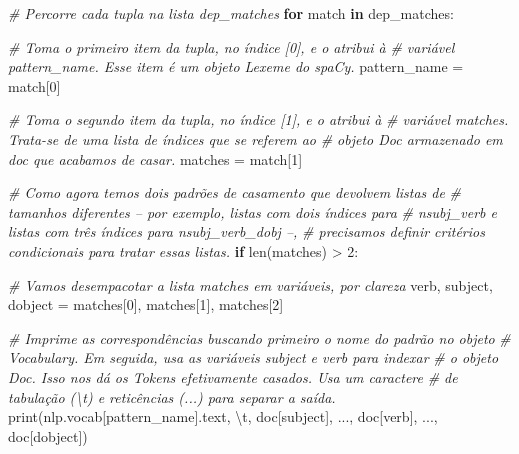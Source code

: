 \documentclass[
  brazilian,
]{article}
\newenvironment{Shaded}{}{}
\newcommand{\BuiltInTok}[1]{#1}
\newcommand{\CharTok}[1]{\textcolor[rgb]{0.25,0.44,0.63}{#1}}
\newcommand{\CommentTok}[1]{\textcolor[rgb]{0.38,0.63,0.69}{\textit{#1}}}
\newcommand{\ControlFlowTok}[1]{\textcolor[rgb]{0.00,0.44,0.13}{\textbf{#1}}}
\newcommand{\DecValTok}[1]{\textcolor[rgb]{0.25,0.63,0.44}{#1}}
\newcommand{\KeywordTok}[1]{\textcolor[rgb]{0.00,0.44,0.13}{\textbf{#1}}}
\newcommand{\NormalTok}[1]{#1}
\newcommand{\OperatorTok}[1]{\textcolor[rgb]{0.40,0.40,0.40}{#1}}
\newcommand{\StringTok}[1]{\textcolor[rgb]{0.25,0.44,0.63}{#1}}
\begin{document}
\begin{Shaded}
\begin{Highlighting}[]
\CommentTok{\# Percorre cada tupla na lista \textquotesingle{}dep\_matches\textquotesingle{}}
\ControlFlowTok{for}\NormalTok{ match }\KeywordTok{in}\NormalTok{ dep\_matches:}

    \CommentTok{\# Toma o primeiro item da tupla, no índice [0], e o atribui à}
    \CommentTok{\# variável \textquotesingle{}pattern\_name\textquotesingle{}. Esse item é um objeto Lexeme do spaCy.}
\NormalTok{    pattern\_name }\OperatorTok{=}\NormalTok{ match[}\DecValTok{0}\NormalTok{]}

    \CommentTok{\# Toma o segundo item da tupla, no índice [1], e o atribui à}
    \CommentTok{\# variável \textquotesingle{}matches\textquotesingle{}. Trata{-}se de uma lista de índices que se referem ao}
    \CommentTok{\# objeto Doc armazenado em \textquotesingle{}doc\textquotesingle{} que acabamos de casar.}
\NormalTok{    matches }\OperatorTok{=}\NormalTok{ match[}\DecValTok{1}\NormalTok{]}

    \CommentTok{\# Como agora temos dois padrões de casamento que devolvem listas de}
    \CommentTok{\# tamanhos diferentes – por exemplo, listas com dois índices para}
    \CommentTok{\# \textquotesingle{}nsubj\_verb\textquotesingle{} e listas com três índices para \textquotesingle{}nsubj\_verb\_dobj\textquotesingle{} –,}
    \CommentTok{\# precisamos definir critérios condicionais para tratar essas listas.}
    \ControlFlowTok{if} \BuiltInTok{len}\NormalTok{(matches) }\OperatorTok{\textgreater{}} \DecValTok{2}\NormalTok{:}

        \CommentTok{\# Vamos desempacotar a lista \textquotesingle{}matches\textquotesingle{} em variáveis, por clareza}
\NormalTok{        verb, subject, dobject }\OperatorTok{=}\NormalTok{ matches[}\DecValTok{0}\NormalTok{], matches[}\DecValTok{1}\NormalTok{], matches[}\DecValTok{2}\NormalTok{]}

        \CommentTok{\# Imprime as correspondências buscando primeiro o nome do padrão no objeto}
        \CommentTok{\# Vocabulary. Em seguida, usa as variáveis \textquotesingle{}subject\textquotesingle{} e \textquotesingle{}verb\textquotesingle{} para indexar}
        \CommentTok{\# o objeto Doc. Isso nos dá os Tokens efetivamente casados. Usa um caractere}
        \CommentTok{\# de tabulação (\textquotesingle{}\textbackslash{}t\textquotesingle{}) e reticências (\textquotesingle{}...\textquotesingle{}) para separar a saída.}
        \BuiltInTok{print}\NormalTok{(nlp.vocab[pattern\_name].text, }\StringTok{\textquotesingle{}}\CharTok{\textbackslash{}t}\StringTok{\textquotesingle{}}\NormalTok{, doc[subject], }\StringTok{\textquotesingle{}...\textquotesingle{}}\NormalTok{, doc[verb], }\StringTok{\textquotesingle{}...\textquotesingle{}}\NormalTok{, doc[dobject])}


\end{Highlighting}
\end{Shaded}
\end{document}
